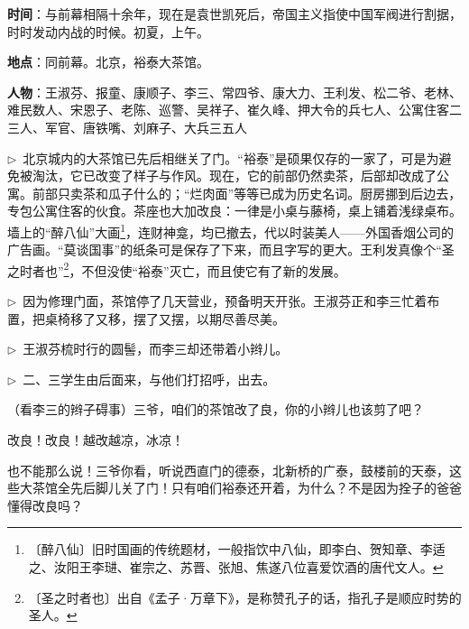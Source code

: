 \documentclass[12pt,UTF-8,openany]{ctexbook}
\begin{document}
\begin{large}
    
    \noindent \textbf{时间}：与前幕相隔十余年，现在是袁世凯死后，帝国主义指使中国军阀进行割据，时时发动内战的时候。初夏，上午。
    
    \noindent \textbf{地点}：同前幕。北京，裕泰大茶馆。
    
    \noindent \textbf{人物}：王淑芬、报童、康顺子、李三、常四爷、康大力、王利发、松二爷、老林、难民数人、宋恩子、老陈、巡警、吴祥子、崔久峰、押大令的兵七人、公寓住客二三人、军官、唐铁嘴、刘麻子、大兵三五人
    
    \noindent $\triangleright$~北京城内的大茶馆已先后相继关了门。“裕泰”是硕果仅存的一家了，可是为避免被淘汰，它已改变了样子与作风。现在，它的前部仍然卖茶，后部却改成了公寓。前部只卖茶和瓜子什么的；“烂肉面”等等已成为历史名词。厨房挪到后边去，专包公寓住客的伙食。茶座也大加改良：一律是小桌与藤椅，桌上铺着浅绿桌布。墙上的“醉八仙”大画\footnote{〔醉八仙〕旧时国画的传统题材，一般指饮中八仙，即李白、贺知章、李适之、汝阳王李琎、崔宗之、苏晋、张旭、焦遂八位喜爱饮酒的唐代文人。}，连财神龛，均已撤去，代以时装美人——外国香烟公司的广告画。“莫谈国事”的纸条可是保存了下来，而且字写的更大。王利发真像个“圣之时者也”\footnote{〔圣之时者也〕出自《孟子·万章下》，是称赞孔子的话，指孔子是顺应时势的圣人。}，不但没使“裕泰”灭亡，而且使它有了新的发展。
    
    \noindent $\triangleright$~因为修理门面，茶馆停了几天营业，预备明天开张。王淑芬正和李三忙着布置，把桌椅移了又移，摆了又摆，以期尽善尽美。
    
    \noindent $\triangleright$~王淑芬梳时行的圆髻，而李三却还带着小辫儿。
    
    \noindent $\triangleright$~二、三学生由后面来，与他们打招呼，出去。
    
    \begin{description}[itemsep=0.5ex,leftmargin=4.5em,labelwidth=4em]
    
    \item[{\color{script-4-0} 王淑芬}]（看李三的辫子碍事）三爷，咱们的茶馆改了良，你的小辫儿也该剪了吧？
    
    \item[{\color{script-4-1} 李三}]改良！改良！越改越凉，冰凉！
    
    \item[{\color{script-4-0} 王淑芬}]也不能那么说！三爷你看，听说西直门的德泰，北新桥的广泰，鼓楼前的天泰，这些大茶馆全先后脚儿关了门！只有咱们裕泰还开着，为什么？不是因为拴子的爸爸懂得改良吗？
    

\end{description}
\end{large}
\end{document}
